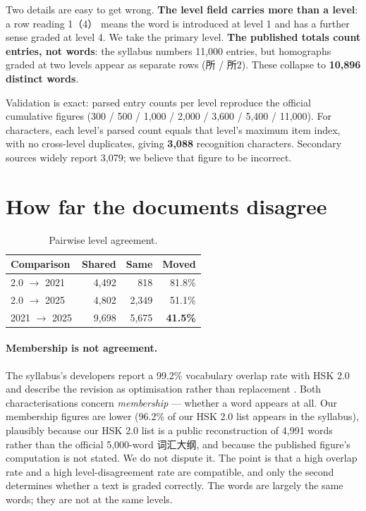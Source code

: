 \documentclass[11pt]{article}
\begin{document}
Two details are easy to get wrong. \textbf{The level field carries more than a
level}: a row reading 1（4） means the word is introduced at level 1 and has a
further sense graded at level 4. We take the primary level. \textbf{The
published totals count entries, not words}: the syllabus numbers 11{,}000
entries, but homographs graded at two levels appear as separate rows
(所 / 所2). These collapse to \textbf{10{,}896 distinct words}.

Validation is exact: parsed entry counts per level reproduce the official
cumulative figures (300 / 500 / 1{,}000 / 2{,}000 / 3{,}600 / 5{,}400 /
11{,}000). For characters, each level's parsed count equals that level's
maximum item index, with no cross-level duplicates, giving \textbf{3{,}088}
recognition characters. Secondary sources widely report 3{,}079; we believe
that figure to be incorrect.

\section{How far the documents disagree}
\label{sec:disagree}

\begin{table}[t]
\centering\small
\begin{tabular}{@{}lrrr@{}}
\toprule
\textbf{Comparison} & \textbf{Shared} & \textbf{Same} & \textbf{Moved} \\
\midrule
2.0 $\rightarrow$ 2021    & 4{,}492 & 818     & 81.8\% \\
2.0 $\rightarrow$ 2025    & 4{,}802 & 2{,}349 & 51.1\% \\
2021 $\rightarrow$ 2025   & 9{,}698 & 5{,}675 & \textbf{41.5\%} \\
\bottomrule
\end{tabular}
\caption{Pairwise level agreement.}
\label{tab:agreement}
\end{table}

\paragraph{Membership is not agreement.} The syllabus's developers report a
99.2\% vocabulary overlap rate with HSK 2.0 and describe the revision as
optimisation rather than replacement \citep{feng2026hsk30}. Both
characterisations concern \emph{membership} --- whether a word appears at all.
Our membership figures are lower (96.2\% of our HSK 2.0 list appears in the
syllabus), plausibly because our HSK 2.0 list is a public reconstruction of
4{,}991 words rather than the official 5{,}000-word 词汇大纲, and because the
published figure's computation is not stated. We do not dispute it. The point
is that a high overlap rate and a high level-disagreement rate are compatible,
and only the second determines whether a text is graded correctly. The words
are largely the same words; they are not at the same levels.
\end{document}
